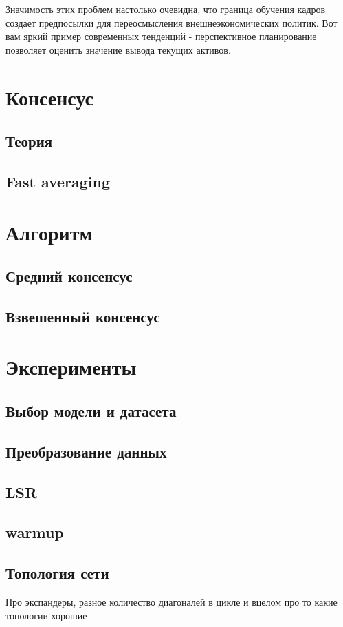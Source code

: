 \documentclass[a4paper,article,14pt]{extarticle}
\begin{document}
Значимость этих проблем настолько очевидна, что граница обучения кадров создает предпосылки для переосмысления внешнеэкономических политик. Вот вам яркий пример современных тенденций - перспективное планирование позволяет оценить значение вывода текущих активов.

\section{Консенсус}
\subsection{Теория}
\subsection{Fast averaging}

\pagebreak
\section{Алгоритм}
\subsection{Средний консенсус}
\subsection{Взвешенный консенсус}

\section{Эксперименты}
\subsection{Выбор модели и датасета}
\subsection{Преобразование данных}
\subsection{LSR}
\subsection{warmup}
\subsection{Топология сети}
Про экспандеры, разное количество диагоналей в цикле и вцелом про то какие топологии хорошие
\end{document}
